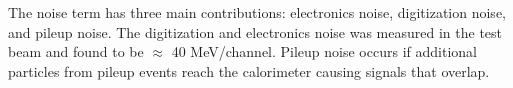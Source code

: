 The noise term has three main contributions: electronics noise, digitization 
noise, and pileup noise. 
The digitization and electronics noise was measured in the test beam and 
found to be $\approx$ 40 MeV/channel. 
Pileup noise occurs if additional particles from pileup events reach the 
calorimeter causing signals that overlap. 